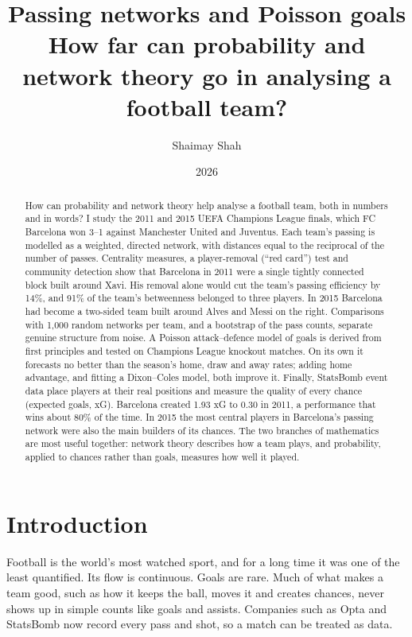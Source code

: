 \documentclass[11pt,a4paper]{article}
\title{\textbf{Passing networks and Poisson goals}\\[4pt]
\large How far can probability and network theory go in analysing a football team?}
\author{Shaimay Shah}
\date{2026}
\begin{document}
\maketitle

\begin{abstract}
\noindent
How can probability and network theory help analyse a football team, both in numbers and in words? I study the 2011 and 2015 UEFA Champions League finals, which FC Barcelona won 3--1 against Manchester United and Juventus. Each team's passing is modelled as a weighted, directed network, with distances equal to the reciprocal of the number of passes. Centrality measures, a player-removal (``red card'') test and community detection show that Barcelona in 2011 were a single tightly connected block built around Xavi. His removal alone would cut the team's passing efficiency by 14\%, and 91\% of the team's betweenness belonged to three players. In 2015 Barcelona had become a two-sided team built around Alves and Messi on the right. Comparisons with 1{,}000 random networks per team, and a bootstrap of the pass counts, separate genuine structure from noise. A Poisson attack--defence model of goals is derived from first principles and tested on \nKO{} Champions League knockout matches. On its own it forecasts no better than the season's home, draw and away rates; adding home advantage, and fitting a Dixon--Coles model, both improve it. Finally, StatsBomb event data place players at their real positions and measure the quality of every chance (expected goals, xG). Barcelona created 1.93 xG to 0.30 in 2011, a performance that wins about 80\% of the time. In 2015 the most central players in Barcelona's passing network were also the main builders of its chances. The two branches of mathematics are most useful together: network theory describes how a team plays, and probability, applied to chances rather than goals, measures how well it played.
\end{abstract}

\tableofcontents
\newpage

\section{Introduction}

Football is the world's most watched sport, and for a long time it was one of the least quantified. Its flow is continuous. Goals are rare. Much of what makes a team good, such as how it keeps the ball, moves it and creates chances, never shows up in simple counts like goals and assists. Companies such as Opta and StatsBomb now record every pass and shot, so a match can be treated as data.
\end{document}
